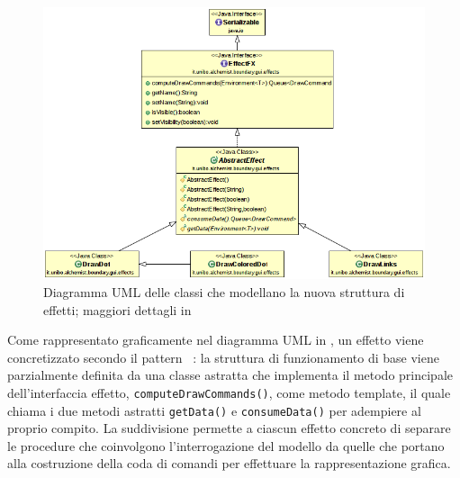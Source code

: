                 \begin{figure}[htbp]
                    \centering
                    \includegraphics[scale=0.5]{img/EffectFXUMLsimple}
                    \caption{Diagramma UML delle classi che modellano la nuova struttura di effetti; maggiori dettagli in }
                    \label{fig:effectFX}
                \end{figure}

                Come rappresentato graficamente nel diagramma UML in , un effetto viene concretizzato secondo il pattern ~\cite{templateMethod}: la struttura di funzionamento di base viene parzialmente definita da una classe astratta che implementa il metodo principale dell'interfaccia effetto, \texttt{computeDrawCommands()}, come metodo template, il quale chiama i due metodi astratti \texttt{getData()} e \texttt{consumeData()} per adempiere al proprio compito.
                La suddivisione permette a ciascun effetto concreto di separare le procedure che coinvolgono l'interrogazione del modello da quelle che portano alla costruzione della coda di comandi per effettuare la rappresentazione grafica.

